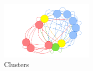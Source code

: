 \begin{figure}
  \centering
    \includegraphics[width=0.40\textwidth]{media/network-sample.png}
    \caption{Clusters\label{fig:network-sample}}
\end{figure}